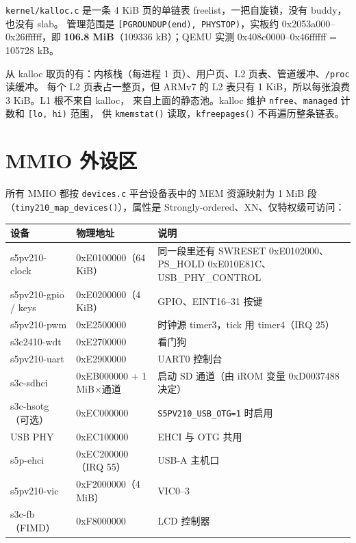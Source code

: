\texttt{kernel/kalloc.c} 是一条 4 KiB 页的单链表 freelist，一把自旋锁，没有 buddy，也没有 slab。
管理范围是 \texttt{[PGROUNDUP(end), PHYSTOP)}，实板约 0x2053a000--0x26ffffff，即
\textbf{106.8 MiB}（109336 kB）；QEMU 实测 0x408c0000--0x46ffffff = 105728 kB。

从 kalloc 取页的有：内核栈（每进程 1 页）、用户页、L2 页表、管道缓冲、\texttt{/proc} 读缓冲。
每个 L2 页表占一整页，但 ARMv7 的 L2 表只有 1 KiB，所以每张浪费 3 KiB。L1 根不来自 kalloc，
来自上面的静态池。kalloc 维护 \texttt{nfree}、\texttt{managed} 计数和 \texttt{[lo, hi)} 范围，
供 \texttt{kmemstat()} 读取，\texttt{kfreepages()} 不再遍历整条链表。

\section{MMIO 外设区}

所有 MMIO 都按 \texttt{devices.c} 平台设备表中的 MEM 资源映射为 1 MiB 段
（\texttt{tiny210\_map\_devices()}），属性是 Strongly-ordered、XN、仅特权级可访问：

\begin{longtable}{@{}>{\raggedright\arraybackslash}p{}>{\raggedright\arraybackslash}p{}>{\raggedright\arraybackslash}p{}@{}}
\toprule
设备 & 物理地址 & 说明 \\
\midrule
\endhead
s5pv210-clock & 0xE0100000（64 KiB） & 同一段里还有 SWRESET 0xE0102000、PS\_HOLD 0xE010E81C、USB\_PHY\_CONTROL \\
s5pv210-gpio / keys & 0xE0200000（4 KiB） & GPIO、EINT16--31 按键 \\
s5pv210-pwm & 0xE2500000 & 时钟源 timer3，tick 用 timer4（IRQ 25） \\
s3c2410-wdt & 0xE2700000 & 看门狗 \\
s5pv210-uart & 0xE2900000 & UART0 控制台 \\
s3c-sdhci & 0xEB000000 + 1 MiB$\times$通道 & 启动 SD 通道（由 iROM 变量 0xD0037488 决定） \\
s3c-hsotg（可选） & 0xEC000000 & \texttt{S5PV210\_USB\_OTG=1} 时启用 \\
USB PHY & 0xEC100000 & EHCI 与 OTG 共用 \\
s5p-ehci & 0xEC200000（IRQ 55） & USB-A 主机口 \\
s5pv210-vic & 0xF2000000（4 MiB） & VIC0--3 \\
s3c-fb（FIMD） & 0xF8000000 & LCD 控制器 \\
\bottomrule
\end{longtable}

